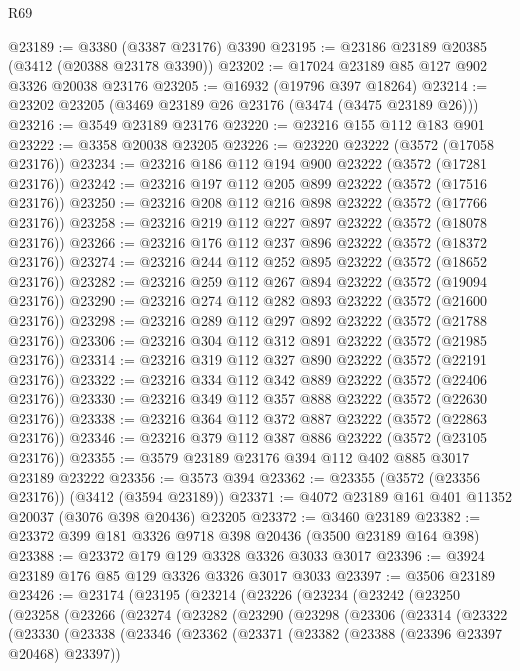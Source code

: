\begin{lexlean}{R69}
\begin{coremodule}
@23189 := @3380 (@3387 @23176) @3390
@23195 := @23186 @23189 @20385 (@3412 (@20388 @23178 @3390))
@23202 := @17024 @23189 @85 @127 @902 @3326 @20038 @23176
@23205 := @16932 (@19796 @397 @18264)
@23214 := @23202 @23205 (@3469 @23189 @26 @23176 (@3474 (@3475 @23189 @26)))
@23216 := @3549 @23189 @23176
@23220 := @23216 @155 @112 @183 @901
@23222 := @3358 @20038 @23205
@23226 := @23220 @23222 (@3572 (@17058 @23176))
@23234 := @23216 @186 @112 @194 @900 @23222 (@3572 (@17281 @23176))
@23242 := @23216 @197 @112 @205 @899 @23222 (@3572 (@17516 @23176))
@23250 := @23216 @208 @112 @216 @898 @23222 (@3572 (@17766 @23176))
@23258 := @23216 @219 @112 @227 @897 @23222 (@3572 (@18078 @23176))
@23266 := @23216 @176 @112 @237 @896 @23222 (@3572 (@18372 @23176))
@23274 := @23216 @244 @112 @252 @895 @23222 (@3572 (@18652 @23176))
@23282 := @23216 @259 @112 @267 @894 @23222 (@3572 (@19094 @23176))
@23290 := @23216 @274 @112 @282 @893 @23222 (@3572 (@21600 @23176))
@23298 := @23216 @289 @112 @297 @892 @23222 (@3572 (@21788 @23176))
@23306 := @23216 @304 @112 @312 @891 @23222 (@3572 (@21985 @23176))
@23314 := @23216 @319 @112 @327 @890 @23222 (@3572 (@22191 @23176))
@23322 := @23216 @334 @112 @342 @889 @23222 (@3572 (@22406 @23176))
@23330 := @23216 @349 @112 @357 @888 @23222 (@3572 (@22630 @23176))
@23338 := @23216 @364 @112 @372 @887 @23222 (@3572 (@22863 @23176))
@23346 := @23216 @379 @112 @387 @886 @23222 (@3572 (@23105 @23176))
@23355 := @3579 @23189 @23176 @394 @112 @402 @885 @3017 @23189 @23222
@23356 := @3573 @394
@23362 := @23355 (@3572 (@23356 @23176)) (@3412 (@3594 @23189))
@23371 := @4072 @23189 @161 @401 @11352 @20037 (@3076 @398 @20436) @23205
@23372 := @3460 @23189
@23382 := @23372 @399 @181 @3326 @9718 @398 @20436 (@3500 @23189 @164 @398)
@23388 := @23372 @179 @129 @3328 @3326 @3033 @3017
@23396 := @3924 @23189 @176 @85 @129 @3326 @3326 @3017 @3033
@23397 := @3506 @23189
@23426 := @23174
    (@23195
      (@23214
        (@23226
          (@23234
            (@23242
              (@23250
                (@23258
                  (@23266
                    (@23274
                      (@23282
                        (@23290
                          (@23298
                            (@23306
                              (@23314
                                (@23322
                                  (@23330
                                    (@23338
                                      (@23346
                                        (@23362
                                          (@23371
                                            (@23382 (@23388 (@23396 @23397 @20468) @23397))

\end{coremodule}
\end{lexlean}
